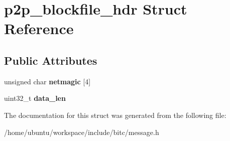 \hypertarget{structp2p__blockfile__hdr}{\section{p2p\-\_\-blockfile\-\_\-hdr Struct Reference}
\label{structp2p__blockfile__hdr}
}
\subsection*{Public Attributes}
\begin{DoxyCompactItemize}
\item 
\hypertarget{structp2p__blockfile__hdr_a263f8d539551f10b291a56e3ebeb7888}{unsigned char {\bfseries netmagic} \mbox{[}4\mbox{]}}\label{structp2p__blockfile__hdr_a263f8d539551f10b291a56e3ebeb7888}

\item 
\hypertarget{structp2p__blockfile__hdr_a69777a42785f1c5090c9499d0704141b}{uint32\-\_\-t {\bfseries data\-\_\-len}}\label{structp2p__blockfile__hdr_a69777a42785f1c5090c9499d0704141b}

\end{DoxyCompactItemize}


The documentation for this struct was generated from the following file\-:\begin{DoxyCompactItemize}
\item 
/home/ubuntu/workspace/include/bitc/message.\-h\end{DoxyCompactItemize}
